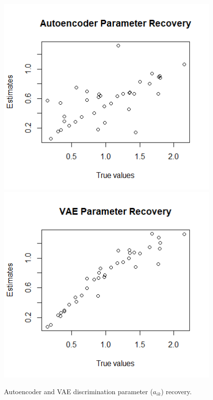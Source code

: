 \begin{figure}[h!]
   \includegraphics[width=\textwidth]{img/aied_results/ae_a_corr.png}
   \endminipage\hfill
   \includegraphics[width=\textwidth]{img/aied_results/vae_a_corr.png}
   \endminipage\hfill
   \caption{Autoencoder and VAE discrimination parameter ($a_{ik}$) recovery.}
   \label{fig:vae_vs_ae_a}
\end{figure}
